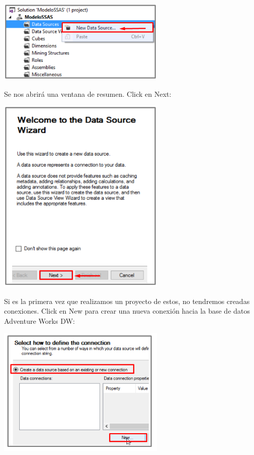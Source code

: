 	\begin{center}
	\includegraphics[width=8cm]{images/task1/img2}
	\end{center}	
Se nos abrirá una ventana de resumen. Click en Next:
	\begin{center}
	\includegraphics[width=8cm]{images/task1/img3}
	\end{center}	
Si es la primera vez que realizamos un proyecto de estos, no tendremos creadas conexiones. Click en New
para crear una nueva conexión hacia la base de datos Adventure Works DW:
	\begin{center}
	\includegraphics[width=8cm]{images/task1/img4}
    \end{center}	
